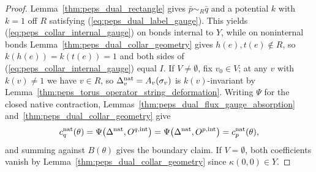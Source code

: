 \begin{proof}\leanok
    Lemma~\ref{thm:peps_dual_rectangle} gives $\bar p\sim_R\bar q$ and a
    potential $k$ with $k=1$ off $R$ satisfying
    (\ref{eq:peps_dual_label_gauge}). This yields
    (\ref{eq:peps_collar_internal_gauge}) on bonds internal to $Y$, while on
    noninternal bonds Lemma~\ref{thm:peps_dual_collar_geometry} gives
    $h(e),t(e)\notin R$, so $k(h(e))=k(t(e))=1$ and both sides of
    (\ref{eq:peps_collar_internal_gauge}) equal $I$. If $V\neq\emptyset$,
    fix $v_0\in V$; at any $v$ with $k(v)\neq1$ we have $v\in R$, so
    $\Delta^{\rm nat}_v=A_v(\sigma_v)$ is $k(v)$-invariant by
    Lemma~\ref{thm:peps_torus_operator_string_deformation}. Writing $\Psi$
    for the closed native contraction,
    Lemmas~\ref{thm:peps_dual_flux_gauge_absorption}
    and~\ref{thm:peps_dual_collar_geometry} give
    \begin{align}
        c^{\rm nat}_q(\theta)
        =\Psi\bigl(\Delta^{\rm nat},O^{q,\rm int}\bigr)
        =\Psi\bigl(\Delta^{\rm nat},O^{p,\rm int}\bigr)
        =c^{\rm nat}_p(\theta),
        \notag
    \end{align}
    and summing against $B(\theta)$ gives the boundary claim. If
    $V=\emptyset$, both coefficients vanish by
    Lemma~\ref{thm:peps_dual_collar_geometry} since $\kappa(0,0)\in Y$.
\end{proof}

